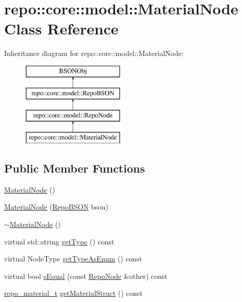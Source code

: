 \hypertarget{classrepo_1_1core_1_1model_1_1_material_node}{}\section{repo\+:\+:core\+:\+:model\+:\+:Material\+Node Class Reference}
\label{classrepo_1_1core_1_1model_1_1_material_node}
Inheritance diagram for repo\+:\+:core\+:\+:model\+:\+:Material\+Node\+:\begin{figure}[H]
\begin{center}
\leavevmode
\includegraphics[height=4.000000cm]{classrepo_1_1core_1_1model_1_1_material_node}
\end{center}
\end{figure}
\subsection*{Public Member Functions}
\begin{DoxyCompactItemize}
\item 
\hyperlink{classrepo_1_1core_1_1model_1_1_material_node_a3a91d737bdf40a14c16e31de27efe2e8}{Material\+Node} ()
\item 
\hyperlink{classrepo_1_1core_1_1model_1_1_material_node_a24fbfaaba7b494de1c6ae9583a15f6a5}{Material\+Node} (\hyperlink{classrepo_1_1core_1_1model_1_1_repo_b_s_o_n}{Repo\+B\+S\+O\+N} bson)
\item 
\hyperlink{classrepo_1_1core_1_1model_1_1_material_node_a85d61ae04a894636d869560a02cefee5}{$\sim$\+Material\+Node} ()
\item 
virtual std\+::string \hyperlink{classrepo_1_1core_1_1model_1_1_material_node_af0debb10133049af18a7c1e45942b606}{get\+Type} () const 
\item 
virtual Node\+Type \hyperlink{classrepo_1_1core_1_1model_1_1_material_node_aa971c1eb43b76f95f28c063dac9919bc}{get\+Type\+As\+Enum} () const 
\item 
virtual bool \hyperlink{classrepo_1_1core_1_1model_1_1_material_node_a65fe37720ba763de81789f5c4f66039a}{s\+Equal} (const \hyperlink{classrepo_1_1core_1_1model_1_1_repo_node}{Repo\+Node} \&other) const 
\item 
\hyperlink{structrepo__material__t}{repo\+\_\+material\+\_\+t} \hyperlink{classrepo_1_1core_1_1model_1_1_material_node_a54c0685ffac3357c71f9a370aad37b43}{get\+Material\+Struct} () const 
\end{DoxyCompactItemize}
